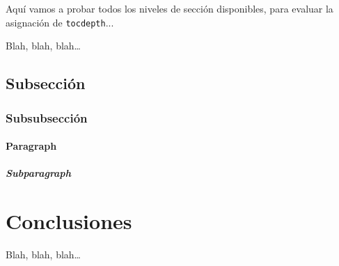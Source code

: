Aquí vamos a probar todos los niveles de sección disponibles, para evaluar la asignación de \texttt{tocdepth}...

Blah, blah, blah\ldots


\subsection{Subsección}
\label{sec:subseccion}


\subsubsection{Subsubsección}
\label{sec:subsubseccion}

\paragraph{Paragraph}
\label{sec:paragraph-1}


\subparagraph{Subparagraph}
\label{sec:subparagraph}



\section{Conclusiones}
\label{sec:conclusiones-teoria}

Blah, blah, blah\ldots

